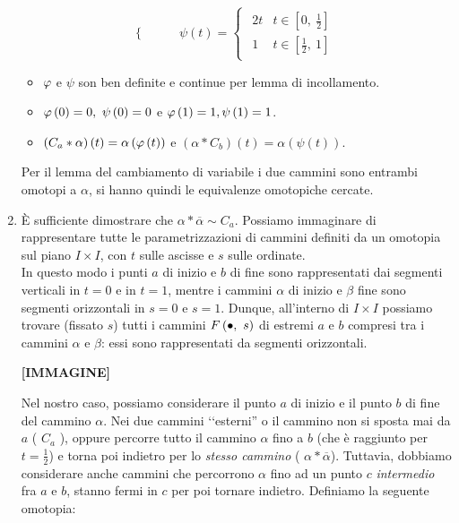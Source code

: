 \begin{demonstration}
\begin{enumerate}[label=\Roman*]
\begin{equation*}
\begin{cases}
	\end{cases}
\qquad	\psi\left(t\right)=
\begin{cases}
	\begin{array}{ll}
		2t&t\in\left[0,\ \frac{1}{2}\right]\\
		1&t\in\left[\frac{1}{2},\ 1\right]
	\end{array}
\end{cases}
\end{equation*}
\begin{itemize}
	\item $\oldphi$ e $\psi$ son ben definite e continue per lemma di incollamento.
	\item $\oldphi\left(0\right)=0,\ \psi\left(0\right)=0$ e $\oldphi\left(1\right)=1,\psi\left(1\right)=1 $.
	\item $\left(C_a\ast \alpha\right)\left(t\right)=\alpha\left(\oldphi\left(t\right)\right)$ e $\left(\alpha\ast C_b\right)\left(t\right)=\alpha\left(\psi\left(t\right)\right)$.
\end{itemize}
Per il lemma del cambiamento di variabile i due cammini sono entrambi omotopi a $\alpha$, si hanno quindi le equivalenze omotopiche cercate.
\item È sufficiente dimostrare che $\alpha\ast\overline{\alpha}\sim C_a$. Possiamo immaginare di rappresentare tutte le parametrizzazioni di cammini definiti da un omotopia sul piano $I\times I$, con $t$ sulle ascisse e $s$ sulle ordinate.\\
In questo modo i punti $a$ di inizio e $b$ di fine sono rappresentati dai segmenti verticali in $t=0$ e in $t=1$, mentre i cammini $\alpha$ di inizio e $\beta$ fine sono segmenti orizzontali in $s=0$ e $s=1$. Dunque, all'interno di $I\times I$ possiamo  trovare (fissato $s$) tutti i cammini $F\left(\bullet,\ s\right)$ di estremi $a$ e $b$ compresi tra i cammini $\alpha$ e $\beta$: essi sono rappresentati da segmenti orizzontali.
\begin{center}
	\textbf{[IMMAGINE]}
\end{center}
Nel nostro caso, possiamo considerare il punto $a$ di inizio e il punto $b$ di fine del cammino $\alpha$. Nei due cammini ‘‘esterni'' o il cammino non si sposta mai da $a$ ( $C_a$ ), oppure percorre tutto il cammino $\alpha$ fino a $b$ (che è raggiunto per $t=\frac{1}{2}$) e torna poi indietro per lo \textit{stesso cammino} ( $\alpha\ast\overline{\alpha}$). Tuttavia, dobbiamo considerare anche cammini che percorrono $\alpha$ fino ad un punto $c$ \textit{intermedio} fra $a$ e $b$, stanno fermi in $c$ per poi tornare indietro. Definiamo la seguente omotopia:

\end{enumerate}
\end{demonstration}
